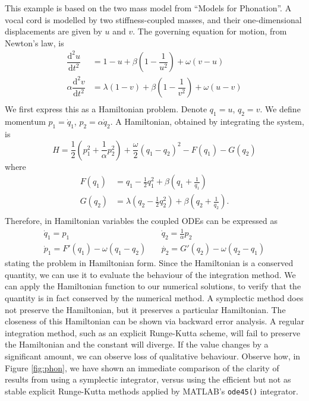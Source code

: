 \documentclass{report}
\theoremstyle{exampstyle} \newtheorem{example}[theorem]{Example}
\theoremstyle{exampstyle} \newtheorem{remark}[theorem]{Remark}
\theoremstyle{exampstyle} \newtheorem{definition}[theorem]{Definition}
\theoremstyle{exampstyle} \newtheorem{lemma}[theorem]{Lemma}
\theoremstyle{exampstyle} \newtheorem{proposition}[theorem]{Proposition}
\begin{document}
This example is based on the two mass model from ``Models for Phonation''.
A vocal cord is modelled by two stiffness-coupled masses, and their one-dimensional displacements are given by $u$ and $v$.
The governing equation for motion, from Newton's law, is
\begin{align*}
	\dfrac{\mathrm{d}^2 u}{\mathrm{d}t^2} &= 1 - u + \beta \left(1 - \dfrac{1}{u^2}\right) + \omega (v - u) \\
	\alpha \dfrac{\mathrm{d}^2 v}{\mathrm{d}t^2} &= \lambda(1 - v) + \beta \left(1 - \dfrac{1}{v^2}\right) + \omega (u - v) \\
\end{align*}
We first express this as a Hamiltonian problem. Denote $q_1 = u$, $q_2 = v$.
We define momentum $p_1 = \dot{q}_1$, $p_2 = \alpha \dot{q}_2$.
A Hamiltonian, obtained by integrating the system, is
\begin{equation*}
	H = \frac{1}{2} \left( p_1^2 + \frac{1}{\alpha} p_2^2 \right) + \frac{\omega}{2}(q_1 - q_2)^2 - F(q_1) - G(q_2)
\end{equation*}
where
\begin{align*}
	F(q_1) &= q_1 - \frac{1}{2}q_1^2 + \beta \left( q_1 + \frac{1}{q_1} \right) \\
	G(q_2) &= \lambda \left(q_2 - \frac{1}{2}q_2^2 \right) + \beta \left( q_2 + \frac{1}{q_2} \right). \\
\end{align*}
Therefore, in Hamiltonian variables the coupled ODEs can be expressed as
\begin{eqnarray*}
	\dot{q}_1 = p_1 & ~ & \dot{q}_2 = \frac{1}{\alpha} p_2 \\
	\dot{p}_1 = F'(q_1) - \omega(q_1 - q_2) & ~ & \dot{p_2} = G'(q_2) - \omega(q_2 - q_1)
\end{eqnarray*}
stating the problem in Hamiltonian form.
Since the Hamiltonian is a conserved quantity, we can use it to evaluate the behaviour of the integration method.
We can apply the Hamiltonian function to our numerical solutions, to verify that the quantity is in fact conserved by the numerical method.
A symplectic method does not preserve the Hamiltonian, but it preserves a particular Hamiltonian.
The closeness of this Hamiltonian can be shown via backward error analysis.
A regular integration method, such as an explicit Runge-Kutta scheme, will fail to preserve the Hamiltonian and the constant will diverge.
If the value changes by a significant amount, we can observe loss of qualitative behaviour.
Observe how, in Figure \ref{fig:phon}, we have shown an immediate comparison of the clarity of results from using a symplectic integrator,
versus using the efficient but not as stable explicit Runge-Kutta methods applied by MATLAB's \texttt{ode45()} integrator.
\end{document}
